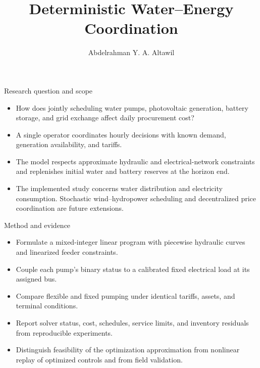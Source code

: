 \documentclass{beamer}
\title{Deterministic Water--Energy Coordination}
\author{Abdelrahman Y. A. Altawil}
\date{}
\begin{document}
\begin{frame}{Research question and scope}
\begin{itemize}
\item How does jointly scheduling water pumps, photovoltaic generation, battery storage, and grid exchange affect daily procurement cost?
\item A single operator coordinates hourly decisions with known demand, generation availability, and tariffs.
\item The model respects approximate hydraulic and electrical-network constraints and replenishes initial water and battery reserves at the horizon end.
\item The implemented study concerns water distribution and electricity consumption. Stochastic wind--hydropower scheduling and decentralized price coordination are future extensions.
\end{itemize}
\end{frame}
\begin{frame}{Method and evidence}
\begin{itemize}
\item Formulate a mixed-integer linear program with piecewise hydraulic curves and linearized feeder constraints.
\item Couple each pump's binary status to a calibrated fixed electrical load at its assigned bus.
\item Compare flexible and fixed pumping under identical tariffs, assets, and terminal conditions.
\item Report solver status, cost, schedules, service limits, and inventory residuals from reproducible experiments.
\item Distinguish feasibility of the optimization approximation from nonlinear replay of optimized controls and from field validation.
\end{itemize}
\end{frame}
\end{document}
